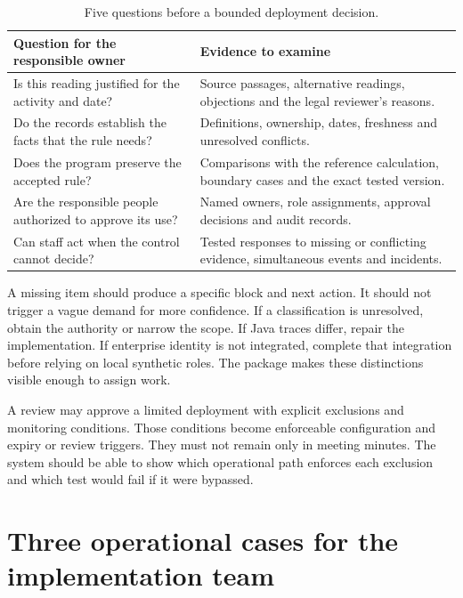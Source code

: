 \documentclass[12pt,a4paper,oneside,openany]{book}
\begin{document}
\begin{table}[H]
\centering
\caption{Five questions before a bounded deployment decision.}
\label{tab:readiness-summary}
\begin{tabularx}{\textwidth}{P{59mm}Y}
\toprule
Question for the responsible owner & Evidence to examine\\
\midrule
Is this reading justified for the activity and date? & Source passages, alternative readings, objections and the legal reviewer's reasons.\\
\addlinespace[0.5em]
Do the records establish the facts that the rule needs? & Definitions, ownership, dates, freshness and unresolved conflicts.\\
\addlinespace[0.5em]
Does the program preserve the accepted rule? & Comparisons with the reference calculation, boundary cases and the exact tested version.\\
\addlinespace[0.5em]
Are the responsible people authorized to approve its use? & Named owners, role assignments, approval decisions and audit records.\\
\addlinespace[0.5em]
Can staff act when the control cannot decide? & Tested responses to missing or conflicting evidence, simultaneous events and incidents.\\
\bottomrule
\end{tabularx}
\end{table}


A missing item should produce a specific block and next action. It should not
trigger a vague demand for more confidence. If a classification is unresolved,
obtain the authority or narrow the scope. If Java traces differ, repair the
implementation. If enterprise identity is not integrated, complete that integration
before relying on local synthetic roles. The package makes these distinctions
visible enough to assign work.

A review may approve a limited deployment with explicit exclusions and monitoring
conditions. Those conditions become enforceable configuration and expiry or
review triggers. They must not remain only in meeting minutes. The system should
be able to show which operational path enforces each exclusion and which test
would fail if it were bypassed.

\section{Three operational cases for the implementation team}
\label{merge:M10:12}
\end{document}
